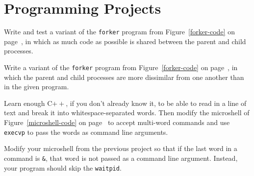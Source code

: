 \section*{Programming Projects}
\begin{chapterEnumerate}
\item\label{refactored-processes-project}
Write and test a variant of the {\tt forker} program from Figure~\ref{forker-code}
on page~\pageref{forker-code},
in which as much code as possible is shared between the parent and
child processes.
\item\label{dissimilar-processes-project}
Write a variant of the {\tt forker} program from Figure~\ref{forker-code} on
page~\pageref{forker-code},
in which
the parent and child processes are more dissimilar
from one another than in the given program.
\item\label{shell-project-1}
Learn enough C$++$, if you don't already know it, to be able to read
in a line of text and break it into whitespace-separated words.  Then
modify the microshell of Figure~\ref{microshell-code} on
page~\pageref{microshell-code} to accept multi-word commands and use
\verb|execvp| to pass the words as command line arguments.
\item\label{shell-project-2}
Modify your microshell from the previous project so that if the last
word in a command is \verb|&|, that word is not passed as a command
line argument.  Instead, your program should skip the \verb|waitpid|.


\end{chapterEnumerate}
